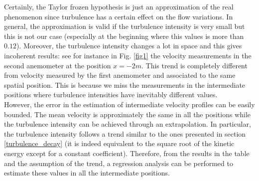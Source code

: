 \documentclass[11pt,titlepage]{article}
\begin{document}
Certainly, the Taylor frozen hypothesis is just an approximation of the real phenomenon since turbulence has a certain effect on the flow variations. In general, the approximation is valid if the turbulence intensity is very small but this is not our case (especially at the beginning where this values is more than $0.12$). Moreover, the turbulence intensity changes a lot in space and this gives incoherent results: see for instance in Fig. \ref{fig1} the velocity measurements in the second anemometer at the position $x=-2m$. This trend is completely different from velocity measured by the first anemometer and associated to the same spatial position. This is because we miss the measurements in the intermediate positions where turbulence intensities have inevitably different values. \\
However, the error in the estimation of intermediate velocity profiles can be easily bounded. The mean velocity is approximately the same in all the positions while the turbulence intensity can be achieved through an extrapolation. In particular, the turbulence intensity follows a trend similar to the ones presented in section \ref{turbulence_decay} (it is indeed equivalent to the square root of the kinetic energy except for a constant coefficient). Therefore, from the results in the table and the assumption of the trend, a regression analysis can be performed to estimate these values in all the intermediate positions.
\end{document}
